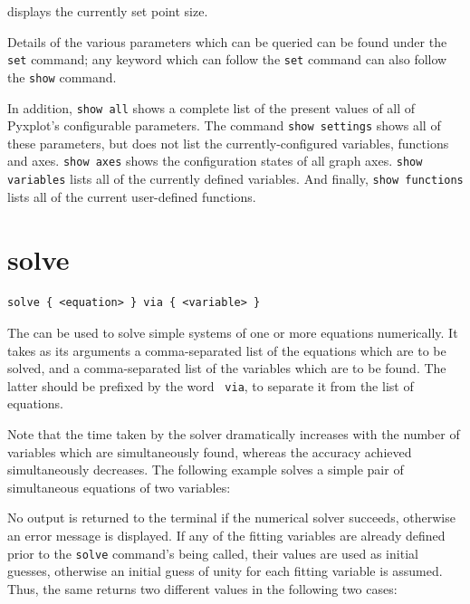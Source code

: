 \noindent displays the currently set point size.

Details of the various parameters which can be queried can be found under the
{\tt set} command; any keyword which can follow the {\tt set} command can also
follow the {\tt show} command.

In addition, {\tt show all} shows a complete list of the present values of all
of Pyxplot's configurable parameters.  The command {\tt show settings} shows
all of these parameters, but does not list the currently-configured variables,
functions and axes. {\tt show axes} shows the configuration states of all graph
axes. {\tt show variables} lists all of the currently defined variables. And
finally, {\tt show functions} lists all of the current user-defined functions.


\section{solve}

\begin{verbatim}
solve { <equation> } via { <variable> }
\end{verbatim}

The  can be used to solve simple systems of one or more
equations numerically. It takes as its arguments a comma-separated list of the
equations which are to be solved, and a comma-separated list of the variables
which are to be found. The latter should be prefixed by the word {\tt
via}, to separate it from the list of equations.

Note that the time taken by the solver dramatically increases with the number
of variables which are simultaneously found, whereas the accuracy achieved
simultaneously decreases. The following example solves a simple pair of
simultaneous equations of two variables:

\vspace{3mm}

\vspace{3mm}

\noindent No output is returned to the terminal if the numerical solver
succeeds, otherwise an error message is displayed. If any of the fitting
variables are already defined prior to the {\tt solve} command's being called,
their values are used as initial guesses, otherwise an initial guess of unity
for each fitting variable is assumed. Thus, the same  returns
two different values in the following two cases:

